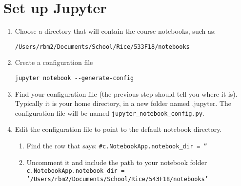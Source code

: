 \documentclass[11pt]{article}
\renewcommand\:{\colon} %
\begin{document}
\section{Set up Jupyter}
\begin{enumerate}
\item Choose a directory that will contain the course notebooks, such as:
\begin{verbatim}
/Users/rbm2/Documents/School/Rice/533F18/notebooks
\end{verbatim}
\item Create a configuration file
\begin{verbatim}
jupyter notebook --generate-config
\end{verbatim}
\item Find your configuration file (the previous step should tell you where it is). Typically it is your home directory, in a new folder named .jupyter. The configuration file will be named \texttt{jupyter\_notebook\_config.py}.
\item Edit the configuration file to point to the default notebook directory.
\begin{enumerate}
\item Find the row that says: \texttt{\#c.NotebookApp.notebook\_dir = ''}
\item Uncomment it and include the path to your notebook folder\\
\small{\texttt{c.NotebookApp.notebook\_dir = '/Users/rbm2/Documents/School/Rice/543F18/notebooks'}}
\end{enumerate}
\end{enumerate}
\end{document}
